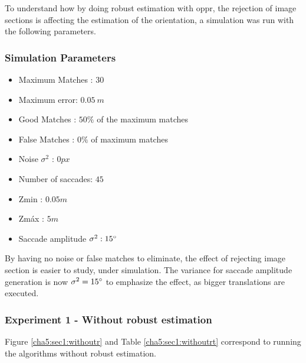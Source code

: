 To understand how by doing robust estimation with \acrshort{oppr}, the rejection of image sections is affecting the estimation of the orientation, a simulation was run with the following parameters.

\subsubsection{Simulation Parameters}
\begin{itemize}
	\item Maximum Matches : $30$
	\item Maximum error: $0.05 \ m$
	\item Good Matches : $50 \%$ of the maximum matches
	\item False Matches : $0 \%$ of maximum matches
	\item Noise $\sigma^2$ : $0 px$
	\item Number of saccades: $45$
	\item Zmin : $0.05 m$
	\item Zmáx : $5 m$
	\item Saccade amplitude $\sigma^2 : 15 \degree $
\end{itemize}

By having no noise or false matches to eliminate, the effect of rejecting image section is easier to study, under simulation. The variance for saccade amplitude generation is now $\sigma^2 = 15 \degree $ to emphasize the effect, as bigger translations are executed.

\subsubsection{Experiment 1 - Without robust estimation}
Figure \ref{cha5:sec1:withoutr} and Table \ref{cha5:sec1:withoutrt} correspond to running the algorithms without robust estimation.\\

